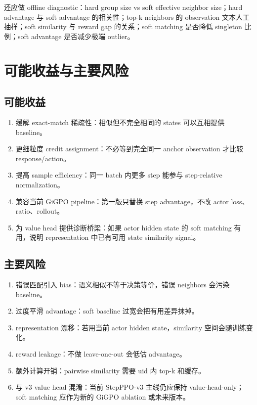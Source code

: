 \documentclass[10pt]{ctexart}
\begin{document}
还应做 offline diagnostic：hard group size vs soft effective neighbor size；hard advantage 与 soft advantage 的相关性；top-k neighbors 的 observation 文本人工抽样；soft similarity 与 reward gap 的关系；soft matching 是否降低 singleton 比例；soft advantage 是否减少极端 outlier。

\section{可能收益与主要风险}
\subsection{可能收益}
\begin{enumerate}
  \item 缓解 exact-match 稀疏性：相似但不完全相同的 states 可以互相提供 baseline。
  \item 更细粒度 credit assignment：不必等到完全同一 anchor observation 才比较 response/action。
  \item 提高 sample efficiency：同一 batch 内更多 step 能参与 step-relative normalization。
  \item 兼容当前 GiGPO pipeline：第一版只替换 step advantage，不改 actor loss、ratio、rollout。
  \item 为 value head 提供诊断桥梁：如果 actor hidden state 的 soft matching 有用，说明 representation 中已有可用 state similarity signal。
\end{enumerate}

\subsection{主要风险}
\begin{enumerate}
  \item 错误匹配引入 bias：语义相似不等于决策等价，错误 neighbors 会污染 baseline。
  \item 过度平滑 advantage：soft baseline 过宽会把有用差异抹掉。
  \item representation 漂移：若用当前 actor hidden state，similarity 空间会随训练变化。
  \item reward leakage：不做 leave-one-out 会低估 advantage。
  \item 额外计算开销：pairwise similarity 需要 uid 内 top-k 和缓存。
  \item 与 v3 value head 混淆：当前 StepPPO-v3 主线仍应保持 value-head-only；soft matching 应作为新的 GiGPO ablation 或未来版本。
\end{enumerate}
\end{document}

